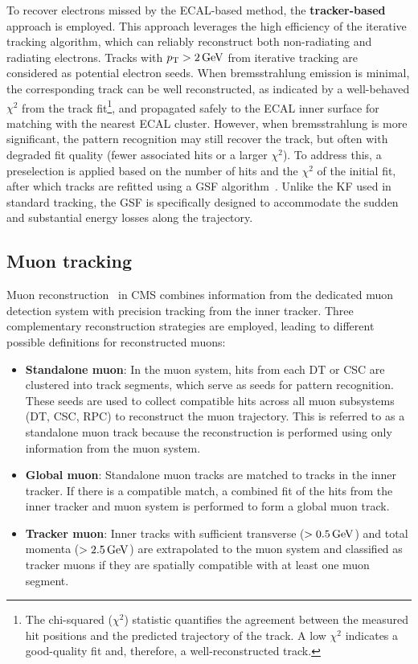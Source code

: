 To recover electrons missed by the \ac{ECAL}-based method, the \textbf{tracker-based} approach is employed. This approach leverages the high efficiency of the iterative tracking algorithm, which can reliably reconstruct both non-radiating and radiating electrons. Tracks with $p_\mathrm{T} > 2\,\text{Ge\hspace{-.08em}V}$ from iterative tracking are considered as potential electron seeds. When bremsstrahlung emission is minimal, the corresponding track can be well reconstructed, as indicated by a well-behaved $\chi^2$ from the track fit\footnote{The chi-squared ($\chi^2$) statistic quantifies the agreement between the measured hit positions and the predicted trajectory of the track. A low $\chi^2$ indicates a good-quality fit and, therefore, a well-reconstructed track.}, and propagated safely to the \ac{ECAL} inner surface for matching with the nearest \ac{ECAL} cluster. However, when bremsstrahlung is more significant, the pattern recognition may still recover the track, but often with degraded fit quality (\ie fewer associated hits or a larger $\chi^2$). To address this, a preselection is applied based on the number of hits and the $\chi^2$ of the initial fit, after which tracks are refitted using a \ac{GSF} algorithm~\cite{GSF_Algorithm}. Unlike the \ac{KF} used in standard tracking, the \ac{GSF} is specifically designed to accommodate the sudden and substantial energy losses along the trajectory.

\subsection{Muon tracking}

Muon reconstruction~\cite{ParticleFlow} in \ac{CMS} combines information from the dedicated muon detection system with precision tracking from the inner tracker. Three complementary reconstruction strategies are employed, leading to different possible definitions for reconstructed muons:

\begin{itemize}
    \item \textbf{Standalone muon}: In the muon system, hits from each \ac{DT} or \ac{CSC} are clustered into track segments, which serve as seeds for pattern recognition. These seeds are used to collect compatible hits across all muon subsystems (\ac{DT}, \ac{CSC}, \ac{RPC}) to reconstruct the muon trajectory. This is referred to as a standalone muon track because the reconstruction is performed using only information from the muon system.
    \item \textbf{Global muon}: Standalone muon tracks are matched to tracks in the inner tracker. If there is a compatible match, a combined fit of the hits from the inner tracker and muon system is performed to form a global muon track.
    \item \textbf{Tracker muon}: Inner tracks with sufficient transverse ($> 0.5\,\text{Ge\hspace{-.08em}V}$) and total momenta ($>2.5\,\text{Ge\hspace{-.08em}V}$) are extrapolated to the muon system and classified as tracker muons if they are spatially compatible with at least one muon segment.
\end{itemize}

